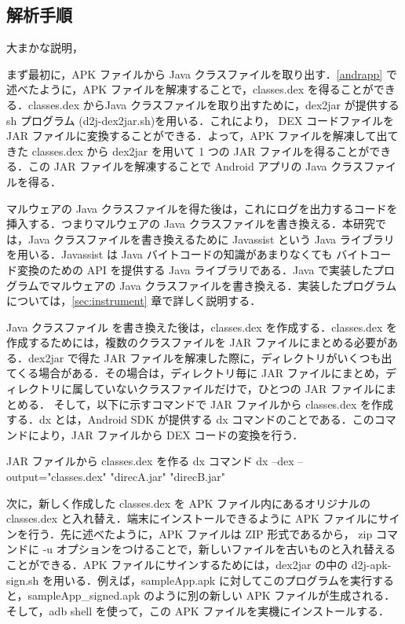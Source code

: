 \subsection{解析手順}
\label{analysismethod}
大まかな説明，

まず最初に，APK ファイルから Java クラスファイルを取り出す．\ref{andrapp} で述べたように，APK ファイルを解凍することで，classes.dex を得ることができる．classes.dex からJava クラスファイルを取り出すために，dex2jar \cite{d2jar} が提供する sh プログラム (d2j-dex2jar.sh)を用いる．これにより， DEX コードファイルを JAR ファイルに変換することができる．よって，APK ファイルを解凍して出てきた classes.dex から dex2jar を用いて 1 つの JAR ファイルを得ることができる．この JAR ファイルを解凍することで Android アプリの Java クラスファイルを得る．

マルウェアの Java クラスファイルを得た後は，これにログを出力するコードを挿入する．つまりマルウェアの Java クラスファイルを書き換える．本研究では，Java クラスファイルを書き換えるために Javassist \cite{javassist} という Java ライブラリを用いる．Javassist は Java バイトコードの知識があまりなくても バイトコード変換のための API を提供する Java ライブラリである．Java で実装したプログラムでマルウェアの Java クラスファイルを書き換える．実装したプログラムについては，\ref{sec:instrument} 章で詳しく説明する．

Java クラスファイル を書き換えた後は，classes.dex を作成する．classes.dex を作成するためには，複数のクラスファイルを JAR ファイルにまとめる必要がある．dex2jar で得た JAR ファイルを解凍した際に，ディレクトリがいくつも出てくる場合がある．その場合は，ディレクトリ毎に JAR ファイルにまとめ，ディレクトリに属していないクラスファイルだけで，ひとつの JAR ファイルにまとめる． そして，以下に示すコマンドで JAR ファイルから classes.dex を作成する．dx とは，Android SDK が提供する dx コマンドのことである．このコマンドにより，JAR ファイルから DEX コードの変換を行う．

\begin{itembox}[l]{JAR ファイルから classes.dex を作る dx コマンド}
	dx --dex --output="classes.dex" "direcA.jar" "direcB.jar" 
\end{itembox}

次に，新しく作成した classes.dex を APK ファイル内にあるオリジナルの classes.dex と入れ替え．端末にインストールできるように APK ファイルにサインを行う．先に述べたように，APK ファイルは ZIP 形式であるから， zip コマンドに -u オプションをつけることで，新しいファイルを古いものと入れ替えることができる．APK ファイルにサインするためには，dex2jar の中の d2j-apk-sign.sh を用いる．例えば，sampleApp.apk に対してこのプログラムを実行すると，sampleApp\_signed.apk のように別の新しい APK ファイルが生成される．そして，adb shell を使って，この APK ファイルを実機にインストールする．

